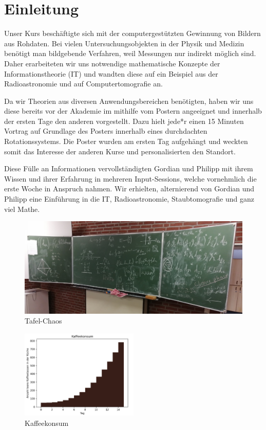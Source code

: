 \section{Einleitung}

Unser Kurs beschäftigte sich mit der computergestützten Gewinnung von Bildern aus Rohdaten. Bei vielen Untersuchungsobjekten in der Physik und Medizin benötigt man bildgebende Verfahren, weil Messungen nur indirekt möglich sind. Daher erarbeiteten wir uns notwendige mathematische Konzepte der Informationstheorie (IT) und wandten diese auf ein Beispiel aus der Radioastronomie und auf Computertomografie an.

Da wir Theorien aus diversen Anwendungsbereichen benötigten, haben wir uns diese bereits vor der Akademie im mithilfe vom Postern angeeignet und innerhalb der ersten Tage den anderen vorgestellt. Dazu hielt jede*r einen 15 Minuten Vortrag auf Grundlage des Posters innerhalb eines durchdachten Rotationssystems. Die Poster wurden am ersten Tag aufgehängt und weckten somit das Interesse der anderen Kurse und personalisierten den Standort.

Diese Fülle an Informationen vervollständigten Gordian und Philipp mit ihrem Wissen und ihrer Erfahrung in mehreren Input-Sessions, welche vornehmlich die erste Woche in Anspruch nahmen. Wir erhielten, alternierend von Gordian und Philipp eine Einführung in die IT, Radioastronomie, Staubtomografie und ganz viel Mathe.

\begin{figure}[htb]
    \centering
    \includegraphics{k4.2/tafelbild.png}
    \caption{Tafel-Chaos}
\end{figure}

\begin{figure}[htb]
    \centering
	\includegraphics[width=0.5\textwidth]{k4.2/kaffee.png}
	\caption{Kaffeekonsum}
    \label{k4.2.fig.kaffee}
\end{figure}


